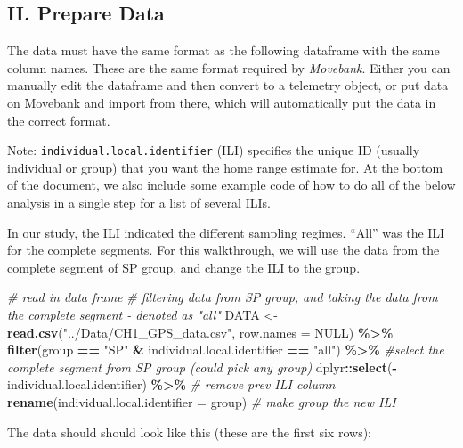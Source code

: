 \documentclass[
]{article}
\newenvironment{Shaded}{\begin{snugshade}}{\end{snugshade}}
\newcommand{\AttributeTok}[1]{\textcolor[rgb]{0.13,0.29,0.53}{#1}}
\newcommand{\CommentTok}[1]{\textcolor[rgb]{0.56,0.35,0.01}{\textit{#1}}}
\newcommand{\ConstantTok}[1]{\textcolor[rgb]{0.56,0.35,0.01}{#1}}
\newcommand{\FunctionTok}[1]{\textcolor[rgb]{0.13,0.29,0.53}{\textbf{#1}}}
\newcommand{\NormalTok}[1]{#1}
\newcommand{\OtherTok}[1]{\textcolor[rgb]{0.56,0.35,0.01}{#1}}
\newcommand{\SpecialCharTok}[1]{\textcolor[rgb]{0.81,0.36,0.00}{\textbf{#1}}}
\newcommand{\StringTok}[1]{\textcolor[rgb]{0.31,0.60,0.02}{#1}}
\begin{document}
\subsection{II. Prepare Data}\label{ii.-prepare-data}

The data must have the same format as the following dataframe with the
same column names. These are the same format required by
\emph{Movebank}. Either you can manually edit the dataframe and then
convert to a telemetry object, or put data on Movebank and import from
there, which will automatically put the data in the correct format.

Note: \texttt{individual.local.identifier} (ILI) specifies the unique ID
(usually individual or group) that you want the home range estimate for.
At the bottom of the document, we also include some example code of how
to do all of the below analysis in a single step for a list of several
ILIs.

In our study, the ILI indicated the different sampling regimes. ``All''
was the ILI for the complete segments. For this walkthrough, we will use
the data from the complete segment of SP group, and change the ILI to
the group.

\begin{Shaded}
\begin{Highlighting}[]
\CommentTok{\# read in data frame }
\CommentTok{\# filtering data from SP group, and taking the data from the complete segment {-} denoted as "all"}
\NormalTok{DATA }\OtherTok{\textless{}{-}} \FunctionTok{read.csv}\NormalTok{(}\StringTok{"../Data/CH1\_GPS\_data.csv"}\NormalTok{, }\AttributeTok{row.names =} \ConstantTok{NULL}\NormalTok{) }\SpecialCharTok{\%\textgreater{}\%} 
  \FunctionTok{filter}\NormalTok{(group }\SpecialCharTok{==} \StringTok{"SP"} \SpecialCharTok{\&}\NormalTok{ individual.local.identifier }\SpecialCharTok{==} \StringTok{"all"}\NormalTok{) }\SpecialCharTok{\%\textgreater{}\%}   \CommentTok{\#select the complete segment from SP group (could pick any group)}
\NormalTok{  dplyr}\SpecialCharTok{::}\FunctionTok{select}\NormalTok{(}\SpecialCharTok{{-}}\NormalTok{individual.local.identifier) }\SpecialCharTok{\%\textgreater{}\%} \CommentTok{\# remove prev ILI column}
  \FunctionTok{rename}\NormalTok{(}\AttributeTok{individual.local.identifier =}\NormalTok{ group) }\CommentTok{\# make group the new ILI}
\end{Highlighting}
\end{Shaded}

The data should should look like this (these are the first six rows):
\end{document}
